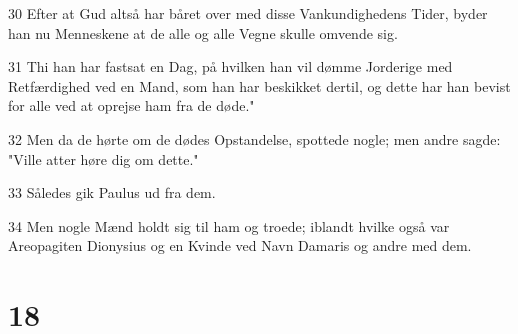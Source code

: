 \par 30 Efter at Gud altså har båret over med disse Vankundighedens Tider, byder han nu Menneskene at de alle og alle Vegne skulle omvende sig.
\par 31 Thi han har fastsat en Dag, på hvilken han vil dømme Jorderige med Retfærdighed ved en Mand, som han har beskikket dertil, og dette har han bevist for alle ved at oprejse ham fra de døde."
\par 32 Men da de hørte om de dødes Opstandelse, spottede nogle; men andre sagde: "Ville atter høre dig om dette."
\par 33 Således gik Paulus ud fra dem.
\par 34 Men nogle Mænd holdt sig til ham og troede; iblandt hvilke også var Areopagiten Dionysius og en Kvinde ved Navn Damaris og andre med dem.

\chapter{18}

